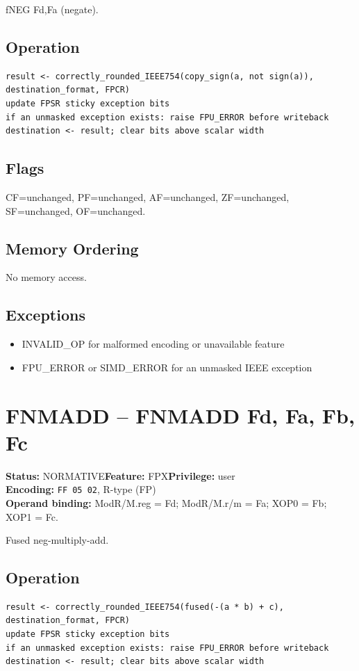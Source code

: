 \documentclass[10pt]{article}
\begin{document}
fNEG Fd,Fa (negate).

\subsection*{Operation}
\begin{lstlisting}
result <- correctly_rounded_IEEE754(copy_sign(a, not sign(a)), destination_format, FPCR)
update FPSR sticky exception bits
if an unmasked exception exists: raise FPU_ERROR before writeback
destination <- result; clear bits above scalar width
\end{lstlisting}
\subsection*{Flags}
CF=unchanged, PF=unchanged, AF=unchanged, ZF=unchanged, SF=unchanged, OF=unchanged.
\subsection*{Memory Ordering}
No memory access.
\subsection*{Exceptions}
\begin{itemize}
\item INVALID\_OP for malformed encoding or unavailable feature
\item FPU\_ERROR or SIMD\_ERROR for an unmasked IEEE exception
\end{itemize}
\clearpage

\section{FNMADD -- FNMADD Fd, Fa, Fb, Fc}
\textbf{Status:} NORMATIVE\quad \textbf{Feature:} FPX\quad \textbf{Privilege:} user\\
\textbf{Encoding:} \texttt{FF 05 02}, R-type (FP)\\
\textbf{Operand binding:} ModR/M.reg = Fd; ModR/M.r/m = Fa; XOP0 = Fb; XOP1 = Fc.

Fused neg-multiply-add.

\subsection*{Operation}
\begin{lstlisting}
result <- correctly_rounded_IEEE754(fused(-(a * b) + c), destination_format, FPCR)
update FPSR sticky exception bits
if an unmasked exception exists: raise FPU_ERROR before writeback
destination <- result; clear bits above scalar width
\end{lstlisting}
\end{document}
